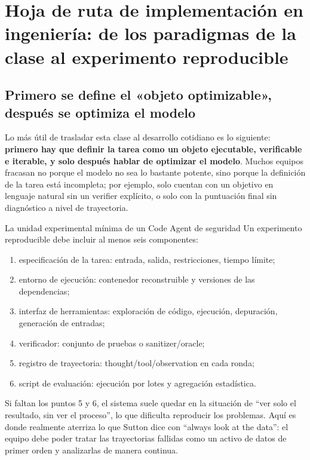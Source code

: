 \section{Hoja de ruta de implementación en ingeniería: de los paradigmas de la clase al experimento reproducible}

\subsection{Primero se define el «objeto optimizable», después se optimiza el modelo}
Lo más útil de trasladar esta clase al desarrollo cotidiano es lo siguiente: \textbf{primero hay que definir la tarea como un objeto ejecutable, verificable e iterable, y solo después hablar de optimizar el modelo}. Muchos equipos fracasan no porque el modelo no sea lo bastante potente, sino porque la definición de la tarea está incompleta; por ejemplo, solo cuentan con un objetivo en lenguaje natural sin un verifier explícito, o solo con la puntuación final sin diagnóstico a nivel de trayectoria.

\begin{importantbox}{La unidad experimental mínima de un Code Agent de seguridad}
Un experimento reproducible debe incluir al menos seis componentes:
\begin{enumerate}
    \item especificación de la tarea: entrada, salida, restricciones, tiempo límite;
    \item entorno de ejecución: contenedor reconstruible y versiones de las dependencias;
    \item interfaz de herramientas: exploración de código, ejecución, depuración, generación de entradas;
    \item verificador: conjunto de pruebas o sanitizer/oracle;
    \item registro de trayectoria: thought/tool/observation en cada ronda;
    \item script de evaluación: ejecución por lotes y agregación estadística.
\end{enumerate}
\end{importantbox}

Si faltan los puntos 5 y 6, el sistema suele quedar en la situación de ``ver solo el resultado, sin ver el proceso'', lo que dificulta reproducir los problemas. Aquí es donde realmente aterriza lo que Sutton dice con ``always look at the data'': el equipo debe poder tratar las trayectorias fallidas como un activo de datos de primer orden y analizarlas de manera continua.

